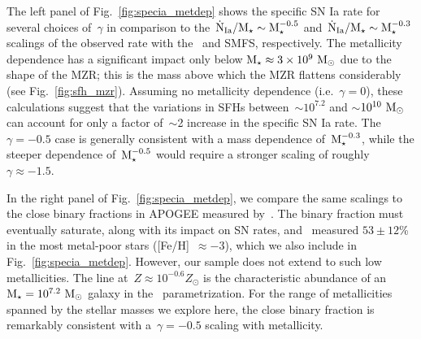 \documentclass[foo.tex]{subfiles}
\begin{document}
The left panel of Fig.~\ref{fig:specia_metdep} shows the specific SN Ia rate
for several choices of~$\gamma$ in comparison to the~$\dot{\text{N}}_\text{Ia} /
\text{M}_\star \sim \text{M}_\star^{-0.5}$ and~$\dot{\text{N}}_\text{Ia} / \text{M}_\star \sim
\text{M}_\star^{-0.3}$ scalings of the observed rate with the~\citet{Bell2003} and
\citet{Baldry2012} SMFS, respectively.
The metallicity dependence has a significant impact only below
$\text{M}_\star \approx 3\times10^9~\text{M}_\odot$ due to the shape of the MZR;
this is the mass above which the MZR flattens considerably (see
Fig.~\ref{fig:sfh_mzr}).
Assuming no metallicity dependence (i.e.~$\gamma = 0$), these calculations
suggest that the variations in SFHs between~$\sim$$10^{7.2}$ and
$\sim$$10^{10}~\text{M}_\odot$ can account for only a factor of~$\sim$2 increase in the
specific SN Ia rate.
The~$\gamma = -0.5$ case is generally consistent with a mass dependence
of~$\text{M}_\star^{-0.3}$, while the steeper dependence of~$\text{M}_\star^{-0.5}$ would
require a stronger scaling of roughly~$\gamma \approx -1.5$.
\par
In the right panel of Fig.~\ref{fig:specia_metdep}, we compare the same
scalings to the close binary fractions in APOGEE measured by~\citet{Moe2019}.
{\color{red}
The binary fraction must eventually saturate, along with its impact on SN
rates, and~\citet{Moe2019} measured
$53 \pm 12$\% in the most metal-poor stars ([Fe/H]~$\approx -3$), which we
also include in Fig.~\ref{fig:specia_metdep}.
However, our sample does not extend to such low metallicities.
}
The line at~$Z \approx 10^{-0.6} Z_\odot$ is the characteristic abundance of
an~$\text{M}_\star = 10^{7.2}~\text{M}_\odot$ galaxy in the~\citet{Zahid2014} parametrization.
For the range of metallicities spanned by the stellar masses we explore here,
the close binary fraction is remarkably consistent with a~$\gamma = -0.5$
scaling with metallicity.
\end{document}

